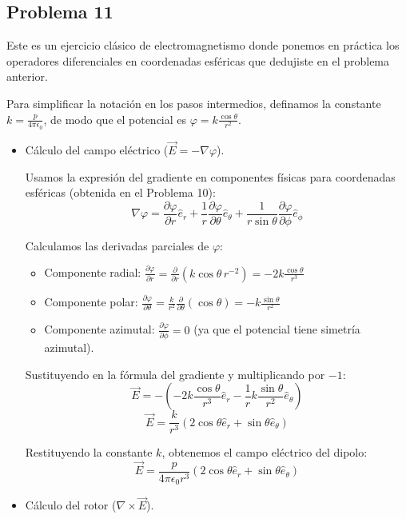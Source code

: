 \documentclass[11pt,spanish]{article}
\newcounter{problema}
\begin{document}
\subsection*{Problema 11}

Este es un ejercicio clásico de electromagnetismo donde ponemos en práctica los operadores diferenciales en coordenadas esféricas que dedujiste en el problema anterior.

Para simplificar la notación en los pasos intermedios, definamos la constante $k = \frac{p}{4\pi\epsilon_0}$, de modo que el potencial es $\varphi = k \frac{\cos\theta}{r^2}$.

\begin{itemize}
\item Cálculo del campo eléctrico ($\vec{E} = -\nabla\varphi$).

Usamos la expresión del gradiente en componentes físicas para coordenadas esféricas (obtenida en el Problema 10):
$$
\nabla \varphi = \frac{\partial \varphi}{\partial r} \hat{e}_r + \frac{1}{r} \frac{\partial \varphi}{\partial \theta} \hat{e}_\theta + \frac{1}{r\sin\theta} \frac{\partial \varphi}{\partial \phi} \hat{e}_\phi
$$

Calculamos las derivadas parciales de $\varphi$:
\begin{itemize}
\item Componente radial: $\frac{\partial \varphi}{\partial r} = \frac{\partial}{\partial r} \left( k \cos\theta \, r^{-2} \right) = -2k \frac{\cos\theta}{r^3}$
\item Componente polar: $\frac{\partial \varphi}{\partial \theta} = \frac{k}{r^2} \frac{\partial}{\partial \theta} (\cos\theta) = -k \frac{\sin\theta}{r^2}$
\item Componente azimutal: $\frac{\partial \varphi}{\partial \phi} = 0$ (ya que el potencial tiene simetría azimutal).
\end{itemize}

Sustituyendo en la fórmula del gradiente y multiplicando por $-1$:
$$
\vec{E} = -\left( -2k \frac{\cos\theta}{r^3} \hat{e}_r - \frac{1}{r} k \frac{\sin\theta}{r^2} \hat{e}_\theta \right)
$$
$$
\vec{E} = \frac{k}{r^3} \left( 2\cos\theta \hat{e}_r + \sin\theta \hat{e}_\theta \right)
$$

Restituyendo la constante $k$, obtenemos el campo eléctrico del dipolo:
$$
\vec{E} = \frac{p}{4\pi\epsilon_0 r^3} \left( 2\cos\theta \hat{e}_r + \sin\theta \hat{e}_\theta \right)
$$

\item Cálculo del rotor ($\nabla \times \vec{E}$).


\end{itemize}
\end{document}
